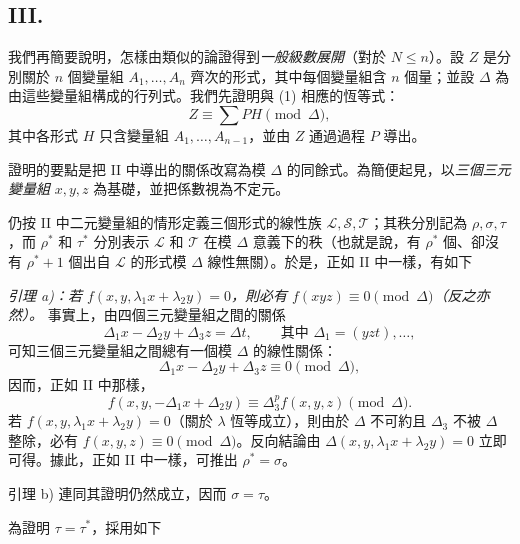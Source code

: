 \documentclass[11pt]{article}
\begin{document}
\subsection*{III.}
我們再簡要說明，怎樣由類似的論證得到\emph{一般級數展開}（對於 $N\le n$）。設 $Z$ 是分別關於 $n$ 個變量組 $A_1,
\ldots,A_n$ 齊次的形式，其中每個變量組含 $n$ 個量；並設 $\Delta$ 為由這些變量組構成的行列式。我們先證明與 (1) 相應的恆等式：
\begin{equation}
  Z\equiv\sum PH \pmod{\Delta},
\tag{2}
\end{equation}
其中各形式 $H$ 只含變量組 $A_1,\ldots,A_{n-1}$，並由 $Z$ 通過過程 $P$ 導出。

證明的要點是把 II 中導出的關係改寫為模 $\Delta$ 的同餘式。為簡便起見，以\emph{三個三元變量組} $x,y,z$ 為基礎，並把係數視為不定元。

仍按 II 中二元變量組的情形定義三個形式的線性族 $\mathcal L,\mathcal S,\mathcal T$；其秩分別記為 $\rho,\sigma,\tau$，而 $\rho^*$ 和 $\tau^*$ 分別表示 $\mathcal L$ 和 $\mathcal T$ 在模 $\Delta$ 意義下的秩（也就是說，有 $\rho^*$ 個、卻沒有 $\rho^*+1$ 個出自 $\mathcal L$ 的形式模 $\Delta$ 線性無關）。於是，正如 II 中一樣，有如下

\emph{引理 a)：若 $f(x,y,\lambda_1x+\lambda_2y)=0$，則必有 $f(xyz)\equiv0\pmod{\Delta}$（反之亦然）。} 事實上，由四個三元變量組之間的關係
\[
  \Delta_1x-\Delta_2y+\Delta_3z=\Delta t,
  \qquad \text{其中 }\Delta_1=(yzt),\ldots,
\]
可知三個三元變量組之間總有一個模 $\Delta$ 的線性關係：
\[
  \Delta_1x-\Delta_2y+\Delta_3z\equiv0\pmod{\Delta},
\]
因而，正如 II 中那樣，
\[
  f(x,y,-\Delta_1x+\Delta_2y)\equiv\Delta_3^p f(x,y,z)\pmod{\Delta}.
\]
若 $f(x,y,\lambda_1x+\lambda_2y)=0$（關於 $\lambda$ 恆等成立），則由於 $\Delta$ 不可約且 $\Delta_3$ 不被 $\Delta$ 整除，必有 $f(x,y,z)\equiv0\pmod{\Delta}$。反向結論由 $\Delta(x,y,\lambda_1x+\lambda_2y)=0$ 立即可得。據此，正如 II 中一樣，可推出 $\rho^*=\sigma$。

引理 b) 連同其證明仍然成立，因而 $\sigma=\tau$。

為證明 $\tau=\tau^*$，採用如下
\end{document}
